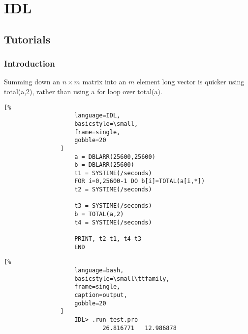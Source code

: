 \documentclass[crop=false,class=article,oneside]{standalone}
\begin{document}
    \ifx\ifcoursesprogrammingtutorials\undefined
        \section*{IDL}
        \setcounter{section}{1}
    \fi
    \subsection{Tutorials}
        \subsubsection{Introduction}
            Summing down an $n\times{m}$ matrix into an $m$ element
            long vector is quicker using total(a,2), rather than using
            a for loop over total(a).
            \newline
            \begin{minipage}[t]{.48\textwidth}
                \centering
                \begin{lstlisting}[%
                    language=IDL,
                    basicstyle=\small,
                    frame=single,
                    gobble=20
                ]
                    a = DBLARR(25600,25600)
                    b = DBLARR(25600)
                    t1 = SYSTIME(/seconds)
                    FOR i=0,25600-1 DO b[i]=TOTAL(a[i,*])
                    t2 = SYSTIME(/seconds)
    
                    t3 = SYSTIME(/seconds)
                    b = TOTAL(a,2)
                    t4 = SYSTIME(/seconds)
    
                    PRINT, t2-t1, t4-t3
                    END
                \end{lstlisting}
            \end{minipage}\hfill
            \begin{minipage}[t]{.48\textwidth}
                \centering
                \begin{lstlisting}[%
                    language=bash,
                    basicstyle=\small\ttfamily,
                    frame=single,
                    caption=output,
                    gobble=20
                ]
                    IDL> .run test.pro
                            26.816771   12.986878
                \end{lstlisting}
            \end{minipage}
\end{document}
